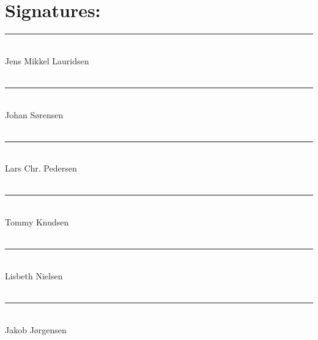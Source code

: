 \chapter*{Signatures:}

\noindent\rule{8cm}{0.03cm}\\
Jens Mikkel Lauridsen\\
\\
\noindent\rule{8cm}{0.03cm}\\
Johan Sørensen\\
\\
\noindent\rule{8cm}{0.03cm}\\ 
Lars Chr. Pedersen\\ 
\\
\noindent\rule{8cm}{0.03cm}\\
Tommy Knudsen\\
\\
\noindent\rule{8cm}{0.03cm}\\ 
Lisbeth Nielsen\\ 
\\
\noindent\rule{8cm}{0.03cm}\\ 
Jakob Jørgensen\\ 
